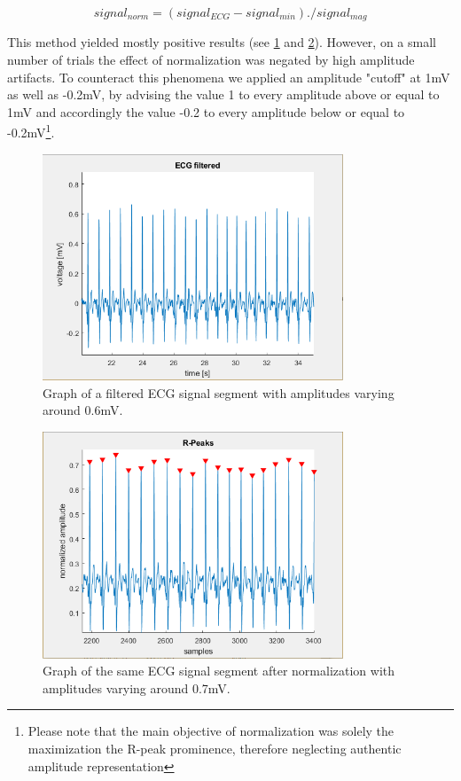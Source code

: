 \begin{equation}
signal_{norm} = (signal_{ECG} - signal_{min})./signal_{mag}
\end{equation}

This method yielded mostly positive results (see \ref{ecgfiltImg} and \ref{ecgnormImg}). However, on a small number of trials the effect of normalization was negated by high amplitude artifacts. To counteract this phenomena we applied an amplitude "cutoff" at 1mV as well as -0.2mV, by advising the value 1 to every amplitude above or equal to 1mV and accordingly the value -0.2 to every amplitude below or equal to -0.2mV\footnote{Please note that the main objective of normalization was solely the maximization the R-peak prominence, therefore neglecting authentic amplitude representation}.

\newpage
\begin{figure}[ht]
\centering
\includegraphics[width=0.8\textwidth]{images/ecgfiltered.png}
\caption{Graph of a filtered ECG signal segment with amplitudes varying around 0.6mV. }
\label{ecgfiltImg}
\end{figure}

\begin{figure}[ht]
\centering
\includegraphics[width=0.8\textwidth]{images/ecgnorm.png}
\caption{Graph of the same ECG signal segment after normalization with amplitudes varying around 0.7mV. }
\label{ecgnormImg}
\end{figure}

